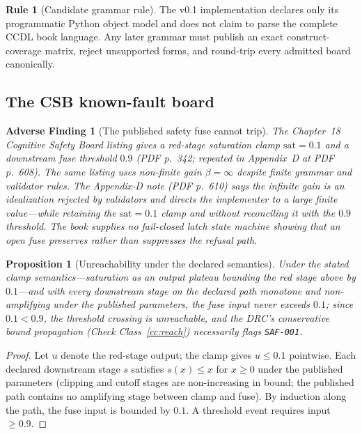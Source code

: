 \documentclass[11pt]{amsart}
\newtheorem{proposition}[theorem]{Proposition}
\newtheorem{finding}[theorem]{Adverse Finding}
\theoremstyle{definition}
\newtheorem{ruleenv}[theorem]{Rule}
\theoremstyle{remark}
\begin{document}
\begin{ruleenv}[Candidate grammar rule]
The v0.1 implementation declares only its programmatic Python object model and does not claim to parse the complete CCDL book language. Any later grammar must publish an exact construct-coverage matrix, reject unsupported forms, and round-trip every admitted board canonically.
\end{ruleenv}

\subsection{The CSB known-fault board}

\begin{finding}[The published safety fuse cannot trip]\label{find:csb}
The Chapter~18 Cognitive Safety Board listing gives a red-stage saturation clamp $\mathrm{sat}=0.1$ and a downstream fuse threshold $0.9$ (PDF p.~342; repeated in Appendix~D at PDF p.~608). The same listing uses non-finite gain $\beta=\infty$ despite finite grammar and validator rules. The Appendix-D note (PDF p.~610) says the infinite gain is an idealization rejected by validators and directs the implementer to a large finite value---while retaining the $\mathrm{sat}=0.1$ clamp and without reconciling it with the $0.9$ threshold. The book supplies no fail-closed latch state machine showing that an open fuse preserves rather than suppresses the refusal path.
\end{finding}

\begin{proposition}[Unreachability under the declared semantics]\label{prop:unreach}
Under the stated clamp semantics---saturation as an output plateau bounding the red stage above by $0.1$---and with every downstream stage on the declared path monotone and non-amplifying under the published parameters, the fuse input never exceeds $0.1$; since $0.1<0.9$, the threshold crossing is unreachable, and the DRC's conservative bound propagation (Check Class~\textup{\ref{cc:reach}}) necessarily flags \texttt{SAF-001}.
\end{proposition}

\begin{proof}
Let $u$ denote the red-stage output; the clamp gives $u\le 0.1$ pointwise. Each declared downstream stage $s$ satisfies $s(x)\le x$ for $x\ge 0$ under the published parameters (clipping and cutoff stages are non-increasing in bound; the published path contains no amplifying stage between clamp and fuse). By induction along the path, the fuse input is bounded by $0.1$. A threshold event requires input $\ge 0.9$.
\end{proof}
\end{document}
